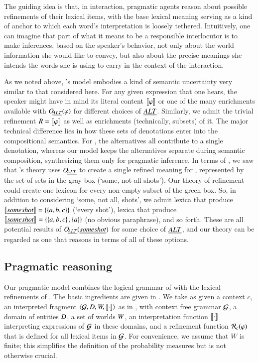 \documentclass[leqno,12pt]{article}
\begin{document}
The guiding idea is that, in interaction, pragmatic agents reason
about possible refinements of their lexical items, with the base
lexical meaning serving as a kind of anchor to which each word's
interpretation is loosely tethered.  Intuitively, one can imagine that
part of what it means to be a responsible interlocutor is to make
inferences, based on the speaker's behavior, not only about the world
information she would like to convey, but also about the precise
meanings she intends the words she is using to carry in the context of
the interaction.

As we noted above, \CFS's model embodies a kind of semantic
uncertainty very similar to that considered here. For any given
expression that one hears, the speaker might have in mind its literal
content $\llbracket\varphi\rrbracket$ or one of the many enrichments available with
$\mathop{O\negthinspace_{\emph{ALT}}}(\varphi)$ for different choices of $\emph{ALT}$. Similarly, we admit
the trivial refinement $R = \llbracket\varphi\rrbracket$ as well as enrichments
(technically, subsets) of it. The major technical difference lies in
how these sets of denotations enter into the compositional
semantics. For \CFS, the alternatives all contribute to a single
denotation, whereas our model keeps the alternatives separate during
semantic composition, synthesizing them only for pragmatic
inference. In terms of , we saw that \CFS's theory
uses $\mathop{O\negthinspace_{\emph{ALT}}}$ to create a single refined meaning for ,
represented by the set of sets in the gray box (`some, not all
shots'). Our theory of refinement could create one lexicon for every
non-empty subset of the green box. So, in addition to considering
`some, not all, shots', we admit lexica that produce
$\llbracket\emph{some shot}\rrbracket = \left\{ \left\{ a,b,c \right\} \right\}$ (`every shot'), lexica
that produce $\llbracket\emph{some shot}\rrbracket = \left\{ \left\{ a,b,c \right\},\left\{ a \right\} \right\}$ (no
obvious paraphrase), and so forth. These are all potential results of
$\mathop{O\negthinspace_{\emph{ALT}}}(\emph{some shot})$ for some choice of $\emph{ALT}$, and our theory
can be regarded as one that reasons in terms of all of these options.


\subsection{Pragmatic reasoning}\label{sec:agents}

Our pragmatic model combines the logical grammar of
 with the lexical refinements of
. The basic ingredients are given in
. We take as given a context $c$, an interpreted
fragment $\langle \mathcal{G}, D, W, \llbracket\cdot\rrbracket \rangle$ as in
, with context free grammar $\mathcal{G}$, a domain
of entities $D$, a set of worlds $W$, an interpretation
function $\llbracket\cdot\rrbracket$ interpreting expressions of $\mathcal{G}$ in these
domains, and a refinement function $\mathcal{R}_{c}(\varphi)$ that is defined
for all lexical items in $\mathcal{G}$.  For convenience, we assume that
$W$ is finite; this simplifies the definition of the probability
measures but is not otherwise crucial.
\end{document}
